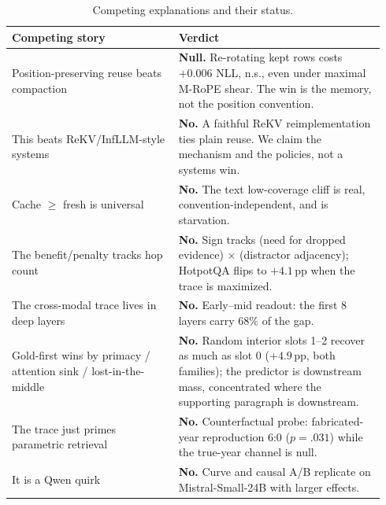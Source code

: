 \documentclass{article} %
\newcommand{\pp}{\,\mathrm{pp}}
\begin{document}
\begin{table}[h]
\centering
\small
\caption{Competing explanations and their status.}
\label{tab:ruledout}
\begin{tabular}{p{0.42\linewidth}p{0.52\linewidth}}
\toprule
Competing story & Verdict \\
\midrule
Position-preserving reuse beats compaction & \textbf{Null.} Re-rotating kept rows costs $+0.006$ NLL, n.s., even under maximal M-RoPE shear. The win is the memory, not the position convention. \\
This beats ReKV/InfLLM-style systems & \textbf{No.} A faithful ReKV reimplementation ties plain reuse. We claim the mechanism and the policies, not a systems win. \\
Cache $\geq$ fresh is universal & \textbf{No.} The text low-coverage cliff is real, convention-independent, and is starvation. \\
The benefit/penalty tracks hop count & \textbf{No.} Sign tracks (need for dropped evidence) $\times$ (distractor adjacency); HotpotQA flips to $+4.1\pp$ when the trace is maximized. \\
The cross-modal trace lives in deep layers & \textbf{No.} Early--mid readout: the first 8 layers carry $68\%$ of the gap. \\
Gold-first wins by primacy / attention sink / lost-in-the-middle & \textbf{No.} Random interior slots 1--2 recover as much as slot 0 ($+4.9\pp$, both families); the predictor is downstream mass, concentrated where the supporting paragraph is downstream. \\
The trace just primes parametric retrieval & \textbf{No.} Counterfactual probe: fabricated-year reproduction 6:0 ($p{=}.031$) while the true-year channel is null. \\
It is a Qwen quirk & \textbf{No.} Curve and causal A/B replicate on Mistral-Small-24B with larger effects. \\
\bottomrule
\end{tabular}
\end{table}



\end{document}
